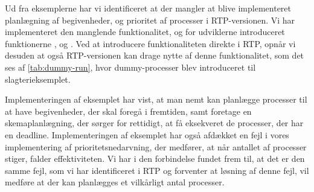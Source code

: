 Ud fra eksemplerne har vi identificeret at der mangler at blive implementeret  planlægning af begivenheder, og prioritet af processer i RTP-versionen. Vi har implementeret den manglende funktionalitet, og for udviklerne introduceret funktionerne ,   og . Ved at introducere funktionaliteten direkte i RTP, opnår vi desuden at også RTP-versionen kan drage nytte af denne funktionalitet, som det ses af \cref{tab:dummy-run}, hvor dummy-processer blev introduceret til slagterieksemplet.

Implementeringen af eksemplet har vist, at man nemt kan planlægge processer til at have begivenheder, der skal foregå i fremtiden, samt foretage en skemaplanlægning, der sørger for  rettidigt, at få eksekveret de processer, der har en deadline. Implementeringen af eksemplet har også afdækket en fejl i vores implementering af prioritetsnedarvning, der medfører, at når antallet af processer stiger, falder effektiviteten. Vi har i den forbindelse fundet frem til, at det er den samme fejl, som vi har identificeret i RTP og forventer at løsning af denne fejl, vil medføre at der kan planlægges et vilkårligt antal processer.
